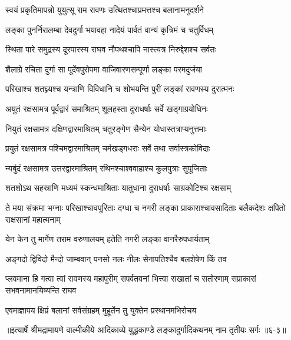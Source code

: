 \twolineshloka
{स्वयं प्रकृतिमापन्नो युयुत्सू राम रावणः}
{उत्थितश्चाप्रमत्तश्च बलानामनुदर्शने} %

\twolineshloka
{लङ्का पुनर्निरालम्बा देवदुर्गा भयावहा}
{नादेयं पार्वतं वान्यं कृत्रिमं च चतुर्विधम्} %

\twolineshloka
{स्थिता पारे समुद्रस्य दूरपारस्य राघव}
{नौपथश्चापि नास्त्यत्र निरुद्देशश्च सर्वतः} %

\twolineshloka
{शैलाग्रे रचिता दुर्गा सा पूर्देवपुरोपमा}
{वाजिवारणसम्पूर्णा लङ्का परमदुर्जया} %

\twolineshloka
{परिखाश्च शतघ्न्यश्च यन्त्राणि विविधानि च}
{शोभयन्ति पुरीं लङ्कां रावणस्य दुरात्मनः} %

\twolineshloka
{अयुतं रक्षसामत्र पूर्वद्वारं समाश्रितम्}
{शूलहस्ता दुराधर्षाः सर्वे खड्गाग्रयोधिनः} %

\twolineshloka
{नियुतं रक्षसामत्र दक्षिणद्वारमाश्रितम्}
{चतुरङ्गेण सैन्येन योधास्तत्राप्यनुत्तमाः} %

\twolineshloka
{प्रयुतं रक्षसामत्र पश्चिमद्वारमाश्रितम्}
{चर्मखड्गधराः सर्वे तथा सर्वास्त्रकोविदाः} %

\twolineshloka
{न्यर्बुदं रक्षसामत्र उत्तरद्वारमाश्रितम्}
{रथिनश्चाश्ववाहाश्च कुलपुत्राः सुपूजिताः} %

\twolineshloka
{शतशोऽथ सहस्राणि मध्यमं स्कन्धमाश्रिताः}
{यातुधाना दुराधर्षाः साग्रकोटिश्च रक्षसाम्} %

\threelineshloka
{ते मया संक्रमा भग्नाः परिखाश्चावपूरिताः}
{दग्धा च नगरी लङ्का प्राकाराश्चावसादिताः}
{बलैकदेशः क्षपितो राक्षसानां महात्मनाम्} %

\twolineshloka
{येन केन तु मार्गेण तराम वरुणालयम्}
{हतेति नगरी लङ्का वानरैरुपधार्यताम्} %

\twolineshloka
{अङ्गदो द्विविदो मैन्दो जाम्बवान् पनसो नलः}
{नीलः सेनापतिश्चैव बलशेषेण किं तव} %

\threelineshloka
{प्लवमाना हि गत्वा त्वां रावणस्य महापुरीम्}
{सपर्वतवनां भित्त्वा सखातां च सतोरणाम्}
{सप्राकारां सभवनामानयिष्यन्ति राघव} %

\twolineshloka
{एवमाज्ञापय क्षिप्रं बलानां सर्वसंग्रहम्}
{मुहूर्तेन तु युक्तेन प्रस्थानमभिरोचय} %


॥इत्यार्षे श्रीमद्रामायणे वाल्मीकीये आदिकाव्ये युद्धकाण्डे लङ्कादुर्गादिकथनम् नाम तृतीयः सर्गः ॥६-३॥
